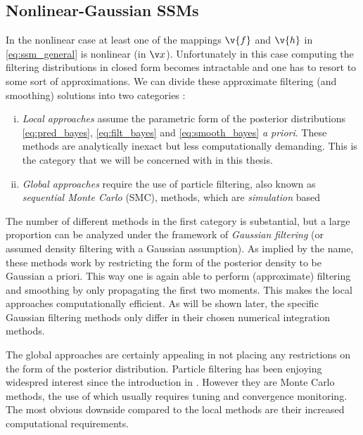 \subsection{Nonlinear-Gaussian SSMs}%
\label{sec:nonlinear_state}
In the nonlinear case at least one of the mappings $\v{f}$ and $\v{h}$ in
\eqref{eq:ssm_general} is nonlinear (in $\x$). Unfortunately in this case computing the filtering
distributions in closed form becomes intractable and one has to resort to 
some sort of approximations. We can
divide these approximate filtering (and smoothing) solutions into two 
categories \parencite[see, e.g.,][]{Arasaratnam2009}: 
\begin{enumerate}[i)] \addtolength{\leftskip}{.5cm} \itemsep1pt \parskip0pt 
  \item \emph{Local approaches} assume the parametric form of the posterior
  distributions \eqref{eq:pred_bayes}, \eqref{eq:filt_bayes} and \eqref{eq:smooth_bayes} \emph{a priori}. 
  These  methods are analytically inexact but less computationally demanding. This is the category that
we will be concerned with in this thesis. 
  \item \emph{Global approaches} require the use of particle filtering, also known as 
  \emph{sequential Monte Carlo} (SMC), 
  methods, which are \emph{simulation} based
\end{enumerate}%
%
The number of different methods in the first category is substantial,
but a large proportion can be analyzed under the framework of
\emph{Gaussian filtering} (or assumed density filtering
with a Gaussian assumption). As implied by the name, these
methods work by restricting the form of the posterior density to be Gaussian
a priori. This way one is again able to perform (approximate) filtering and smoothing
by only propagating the first two moments. This makes the local approaches
computationally efficient.  As will be shown later, the specific Gaussian filtering 
methods only differ in their chosen numerical integration methods.

The global approaches are certainly appealing in not placing
any restrictions on the form of the posterior distribution. Particle filtering
has been enjoying widespred interest since the introduction 
in \textcite{Gordon1993} \parencite[see also][]{Cappe2007,Kantas2009,Cappe2005}. However they
are Monte Carlo methods, the use of which usually requires tuning
and convergence monitoring. The most obvious downside compared to
the local methods are their increased computational requirements. 

